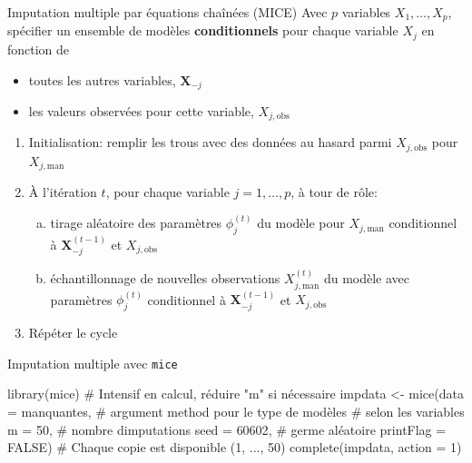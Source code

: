 \documentclass[
  ignorenonframetext,
]{beamer}
\newenvironment{Shaded}{\begin{snugshade}}{\end{snugshade}}
\newcommand{\AttributeTok}[1]{\textcolor[rgb]{0.40,0.45,0.13}{#1}}
\newcommand{\CommentTok}[1]{\textcolor[rgb]{0.37,0.37,0.37}{#1}}
\newcommand{\ConstantTok}[1]{\textcolor[rgb]{0.56,0.35,0.01}{#1}}
\newcommand{\DecValTok}[1]{\textcolor[rgb]{0.68,0.00,0.00}{#1}}
\newcommand{\FunctionTok}[1]{\textcolor[rgb]{0.28,0.35,0.67}{#1}}
\newcommand{\NormalTok}[1]{\textcolor[rgb]{0.00,0.23,0.31}{#1}}
\newcommand{\OtherTok}[1]{\textcolor[rgb]{0.00,0.23,0.31}{#1}}
\providecommand{\tightlist}{%
  \setlength{\itemsep}{0pt}\setlength{\parskip}{0pt}}\usepackage{longtable,booktabs,array}
\begin{document}
\begin{frame}{Imputation multiple par équations chaînées (MICE)}
\protect\hypertarget{imputation-multiple-par-uxe9quations-chauxeenuxe9es-mice}{}
Avec \(p\) variables \(X_1, \ldots, X_p\), spécifier un ensemble de
modèles \textbf{conditionnels} pour chaque variable \(X_j\) en fonction
de

\begin{itemize}
\tightlist
\item
  toutes les autres variables, \(\boldsymbol{X}_{-j}\)
\item
  les valeurs observées pour cette variable, \(X_{j, \text{obs}}\)
\end{itemize}

\begin{enumerate}
\tightlist
\item
  Initialisation: remplir les trous avec des données au hasard parmi
  \(X_{j, \text{obs}}\) pour \(X_{j, \text{man}}\)
\item
  À l'itération \(t\), pour chaque variable \(j=1, \ldots, p\), à tour
  de rôle:

  \begin{enumerate}
  [a)]
  \tightlist
  \item
    tirage aléatoire des paramètres \(\phi_j^{(t)}\) du modèle pour
    \(X_{j,\text{man}}\) conditionnel à \(\boldsymbol{X}_{-j}^{(t-1)}\)
    et \(X_{j, \text{obs}}\)
  \item
    échantillonnage de nouvelles observations \(X^{(t)}_{j,\text{man}}\)
    du modèle avec paramètres \(\phi_j^{(t)}\) conditionnel à
    \(\boldsymbol{X}_{-j}^{(t-1)}\) et \(X_{j, \text{obs}}\)
  \end{enumerate}
\item
  Répéter le cycle
\end{enumerate}
\end{frame}

\begin{frame}[fragile]{Imputation multiple avec \texttt{mice}}
\protect\hypertarget{imputation-multiple-avec-mice}{}
\begin{Shaded}
\begin{Highlighting}[numbers=left,,]
\FunctionTok{library}\NormalTok{(mice)}
\CommentTok{\# Intensif en calcul, réduire "m" si nécessaire}
\NormalTok{impdata }\OtherTok{\textless{}{-}} \FunctionTok{mice}\NormalTok{(}\AttributeTok{data =}\NormalTok{ manquantes,}
                \CommentTok{\# argument method pour le type de modèles}
                \CommentTok{\# selon les variables}
                \AttributeTok{m =} \DecValTok{50}\NormalTok{, }\CommentTok{\# nombre d\textquotesingle{}imputations}
                \AttributeTok{seed =} \DecValTok{60602}\NormalTok{, }\CommentTok{\# germe aléatoire}
                \AttributeTok{printFlag =} \ConstantTok{FALSE}\NormalTok{)}
\CommentTok{\# Chaque copie est disponible (1, ..., 50)}
\FunctionTok{complete}\NormalTok{(impdata, }\AttributeTok{action =} \DecValTok{1}\NormalTok{)}
\end{Highlighting}
\end{Shaded}
\end{frame}
\end{document}
